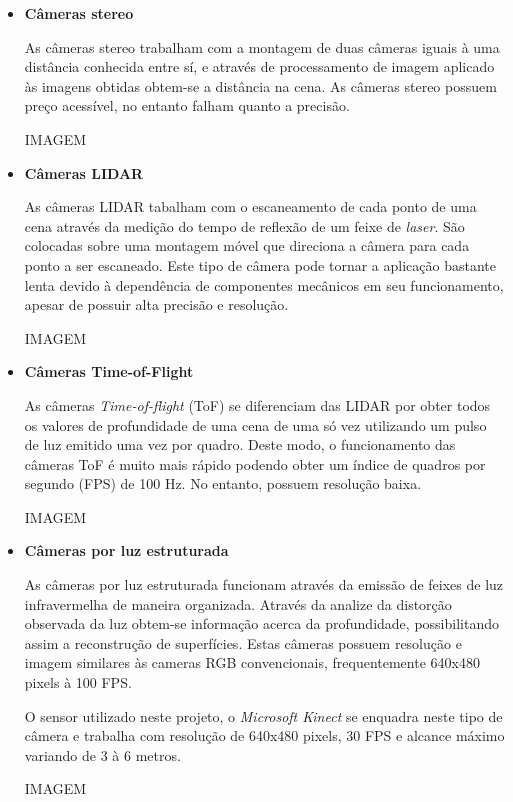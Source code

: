 \documentclass[12pt]{article}
\begin{document}
\begin{itemize}
  
\item \textbf{Câmeras stereo}

As câmeras stereo trabalham com a montagem de duas câmeras iguais à uma distância conhecida entre sí, e através de processamento de imagem aplicado às imagens obtidas obtem-se a distância na cena. As câmeras stereo possuem preço acessível, no entanto falham quanto a precisão.

IMAGEM

\item \textbf{Câmeras LIDAR}

As câmeras LIDAR tabalham com o escaneamento de cada ponto de uma cena através da medição do tempo de reflexão de um feixe de \textit{laser}. São colocadas sobre uma montagem móvel que direciona a câmera para cada ponto a ser escaneado. Este tipo de câmera pode tornar a aplicação bastante lenta devido à dependência de componentes mecânicos em seu funcionamento, apesar de possuir alta precisão e resolução.

IMAGEM

\item \textbf{Câmeras Time-of-Flight}

As câmeras \textit{Time-of-flight} (ToF) se diferenciam das LIDAR por obter todos os valores de profundidade de uma cena de uma só vez utilizando um pulso de luz emitido uma vez por quadro. Deste modo, o funcionamento das câmeras ToF é muito mais rápido podendo obter um índice de quadros por segundo (FPS) de 100 Hz. No entanto, possuem resolução baixa.

IMAGEM

\item \textbf{Câmeras por luz estruturada}

As câmeras por luz estruturada funcionam através da emissão de feixes de luz infravermelha de maneira organizada. Através da analize da distorção observada da luz obtem-se informação acerca da profundidade, possibilitando assim a reconstrução de superfícies. Estas câmeras possuem resolução e imagem similares às cameras RGB convencionais, frequentemente 640x480 pixels à 100 FPS.

O sensor utilizado neste projeto, o \textit{Microsoft Kinect} se enquadra neste tipo de câmera e trabalha com resolução de 640x480 pixels, 30 FPS e alcance máximo variando de 3 à 6 metros.

IMAGEM
\end{itemize}
\end{document}
